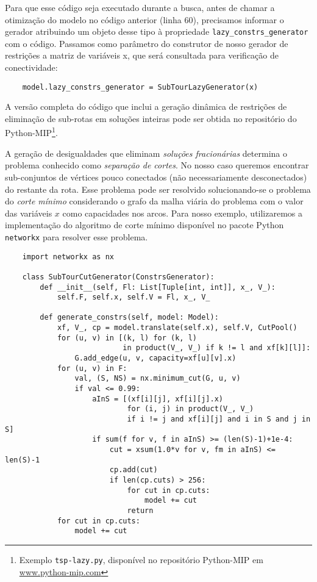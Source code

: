 \documentclass[a4paper,11pt,fleqn]{article}
\begin{document}
Para que esse código seja executado durante a busca, antes de chamar a otimização do modelo no código anterior (linha 60), precisamos informar o gerador atribuindo um objeto desse tipo à propriedade \texttt{lazy\_constrs\_generator} com o código. Passamos como parâmetro do construtor de nosso gerador de restrições a matriz de variáveis x, que será consultada para verificação de conectividade: 

\begin{verbatim}
    model.lazy_constrs_generator = SubTourLazyGenerator(x)
\end{verbatim}

A versão completa do código que inclui a geração dinâmica de restrições de eliminação de sub-rotas em soluções inteiras pode ser obtida no repositório do Python-MIP\footnote{Exemplo \texttt{tsp-lazy.py}, disponível no repositório Python-MIP em \url{www.python-mip.com}}.

A geração de desigualdades que eliminam \emph{soluções fracionárias} determina o problema conhecido como \emph{separação de cortes}. No nosso caso queremos encontrar sub-conjuntos de vértices pouco conectados (não necessariamente desconectados) do restante da rota. Esse problema pode ser resolvido solucionando-se o problema do \emph{corte mínimo} considerando o grafo da malha viária do problema com o valor das variáveis $x$ como capacidades nos arcos. 
Para nosso exemplo, utilizaremos a implementação do algoritmo de corte mínimo disponível no pacote Python \texttt{networkx} para resolver esse problema.

\begin{verbatim}
    import networkx as nx

    class SubTourCutGenerator(ConstrsGenerator):
        def __init__(self, Fl: List[Tuple[int, int]], x_, V_):
            self.F, self.x, self.V = Fl, x_, V_

        def generate_constrs(self, model: Model):
            xf, V_, cp = model.translate(self.x), self.V, CutPool()
            for (u, v) in [(k, l) for (k, l) 
                           in product(V_, V_) if k != l and xf[k][l]]:
                G.add_edge(u, v, capacity=xf[u][v].x)
            for (u, v) in F:
                val, (S, NS) = nx.minimum_cut(G, u, v)
                if val <= 0.99:
                    aInS = [(xf[i][j], xf[i][j].x)
                            for (i, j) in product(V_, V_) 
                            if i != j and xf[i][j] and i in S and j in S]
                    if sum(f for v, f in aInS) >= (len(S)-1)+1e-4:
                        cut = xsum(1.0*v for v, fm in aInS) <= len(S)-1
                        cp.add(cut)
                        if len(cp.cuts) > 256:
                            for cut in cp.cuts:
                                model += cut
                            return
            for cut in cp.cuts:
                model += cut

\end{verbatim}
\end{document}
